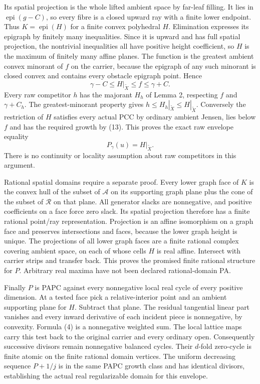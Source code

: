 \documentclass[
  11pt,
]{article}
\begin{document}
Its spatial projection is the whole lifted ambient space by far-leaf
filling. It lies in \(\operatorname{epi}(g-C)\), so every fibre is a
closed upward ray with a finite lower endpoint. Thus
\(K=\operatorname{epi}(H)\) for a finite convex polyhedral \(H\).
Elimination expresses its epigraph by finitely many inequalities. Since
it is upward and has full spatial projection, the nontrivial
inequalities all have positive height coefficient, so \(H\) is the
maximum of finitely many affine planes. The function is the greatest
ambient convex minorant of \(f\) on the carrier, because the epigraph of
any such minorant is closed convex and contains every obstacle epigraph
point. Hence
\[\gamma-C\leq H|_{\widetilde X}\leq f\leq\gamma+C. \tag{13}\] Every raw
competitor \(h\) has the majorant \(H_h\) of Lemma 2, respecting \(f\)
and \(\gamma+C_h\). The greatest-minorant property gives
\(h\leq H_h|_{\widetilde X}\leq H|_{\widetilde X}\). Conversely the
restriction of \(H\) satisfies every actual PCC by ordinary ambient
Jensen, lies below \(f\) and has the required growth by (13). This
proves the exact raw envelope equality
\[P_\gamma(u)=H|_{\widetilde X}. \tag{14}\] There is no continuity or
locality assumption about raw competitors in this argument.

Rational spatial domains require a separate proof. Every lower graph
face of \(K\) is the convex hull of the subset of \(\mathcal A\) on its
supporting graph plane plus the cone of the subset of \(\mathcal R\) on
that plane. All generator slacks are nonnegative, and positive
coefficients on a face force zero slack. Its spatial projection
therefore has a finite rational point/ray representation. Projection is
an affine isomorphism on a graph face and preserves intersections and
faces, because the lower graph height is unique. The projections of all
lower graph faces are a finite rational complex covering ambient space,
on each of whose cells \(H\) is real affine. Intersect with carrier
strips and transfer back. This proves the promised finite rational
structure for \(P\). Arbitrary real maxima have not been declared
rational-domain PA.

Finally \(P\) is PAPC against every nonnegative local real cycle of
every positive dimension. At a tested face pick a relative-interior
point and an ambient supporting plane for \(H\). Subtract that plane.
The residual tangential linear part vanishes and every inward derivative
of each incident piece is nonnegative, by convexity. Formula (4) is a
nonnegative weighted sum. The local lattice maps carry this test back to
the original carrier and every ordinary open. Consequently successive
divisors remain nonnegative balanced cycles. Their \(d\)-fold zero-cycle
is finite atomic on the finite rational domain vertices. The uniform
decreasing sequence \(P+1/j\) is in the same PAPC growth class and has
identical divisors, establishing the actual real regularizable domain
for this envelope.
\end{document}
